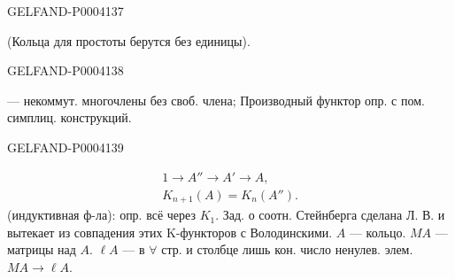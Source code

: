 \begin{GelfandAdjacentEvidence}{GELFAND-P000413}{7}


(Кольца для простоты берутся без единицы).
\end{GelfandAdjacentEvidence}
\begin{GelfandAdjacentEvidence}{GELFAND-P000413}{8}


— некоммут. многочлены без своб. члена;
Производный функтор опр. с пом. симплиц. конструкций.
\end{GelfandAdjacentEvidence}
\begin{GelfandAdjacentEvidence}{GELFAND-P000413}{9}


\begingroup\color{black}\begin{gather*}
1\longrightarrow A''\longrightarrow A'\longrightarrow A,\\
K_{n+1}(A)=K_n(A'').
\end{gather*}\endgroup
(индуктивная ф-ла): опр. всё через $K_1$.
Зад. о соотн. Стейнберга сделана Л. В. и вытекает из совпадения этих K-функторов с Володинскими.
$A$ — кольцо.
$MA$ — матрицы над $A$.
$\ell A$ — в $\forall$ стр. и столбце лишь кон. число ненулев. элем.
$MA\longrightarrow\ell A$.
\end{GelfandAdjacentEvidence}



